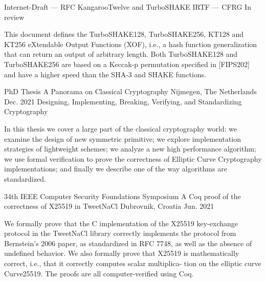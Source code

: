 {}


\begin{cventries}

	\cventry
	{Internet-Draft --- RFC}
	{KangarooTwelve and TurboSHAKE} %
	{IRTF --- CFRG} %
	{In review} %
	{
		\begin{cvitems} %
			\item {This document defines the TurboSHAKE128, TurboSHAKE256, KT128 and KT256 eXtendable Output Functions (XOF),
			i.e., a hash function generalization that can return an output of arbitrary length.
			Both TurboSHAKE128 and TurboSHAKE256 are based on a Keccak-p permutation specified in [FIPS202]
			and have a higher speed than the SHA-3 and SHAKE functions.}
		\end{cvitems}
	}
	
	\cventrysix
	{PhD Thesis}
	{A Panorama on Classical Cryptography}
	{Nijmegen, The Netherlands} %
	{Dec. 2021} %
	{Designing, Implementing, Breaking, Verifying, and Standardizing Cryptography} %
	{
		\begin{cvitems} %
			\item {In this thesis we cover a large part of the classical cryptography world: we examine the design of new symmetric primitive; we explore implementation strategies of lightweight schemes; we analyze a new high performance algorithm; we use formal verification to prove the correctness of Elliptic Curve Cryptography implementations; and finally we describe one of the way algorithms are standardized.}
		\end{cvitems}
	}	%

	\cventry
	{34th IEEE Computer Security Foundations Symposium}
	{A Coq proof of the correctness of X25519 in TweetNaCl} %
	{Dubrovnik, Croatia} %
	{Jun. 2021} %
	{
		\begin{cvitems} %
			\item {We formally prove that the C implementation of the X25519
			            key-exchange protocol in the TweetNaCl library correctly implements the protocol from Bernstein’s 2006 paper, as standardized in RFC 7748, as well
			            as the absence of undefined behavior. We also formally prove that X25519 is mathematically correct, i.e., that it correctly computes scalar multiplica-
			            tion on the elliptic curve Curve25519. The proofs are all computer-verified using Coq.}
		\end{cvitems}
	}


\end{cventries}
